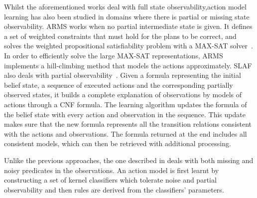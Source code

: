 Whilst the aforementioned works deal with full state observability,action model learning has also been studied in domains where there is partial or missing state observability. {\sf ARMS} works when no partial intermediate state is given. It defines a set of weighted constraints that must hold for the plans to be correct, and solves the weighted propositional satisfiability problem with a MAX-SAT solver~\cite{yang2007learning}. In order to efficiently solve the large MAX-SAT representations, {\sf ARMS} implements a hill-climbing method that models the actions approximately. %
{\sc SLAF} also deals with partial observability~\cite{amir:alearning:JAIR08}. Given a formula representing the initial belief state, a sequence of executed actions and the corresponding partially observed states, it builds a complete explanation of observations by models of actions through a CNF formula. The learning algorithm updates the formula of the belief state with every action and observation in the sequence. This update makes sure that the new formula represents all the transition relations consistent with the actions and observations. The formula returned at the end includes all consistent models, which can then be retrieved with additional processing.

Unlike the previous approaches, the one described in \cite{MouraoZPS12} deals with both missing and noisy predicates in the observations. An action model is first learnt by constructing a set of kernel classifiers which tolerate noise and partial observability and then \strips rules are derived from the classifiers' parameters.

